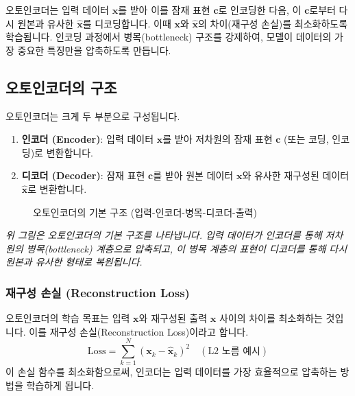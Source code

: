 \documentclass[11pt,a4paper]{article}
\theoremstyle{definition}
\begin{document}
\begin{infobox}
오토인코더는 입력 데이터 $\mathbf{x}$를 받아 이를 잠재 표현 $\mathbf{c}$로 인코딩한 다음, 이 $\mathbf{c}$로부터 다시 원본과 유사한 $\hat{\mathbf{x}}$를 디코딩합니다. 이때 $\mathbf{x}$와 $\hat{\mathbf{x}}$의 차이(재구성 손실)를 최소화하도록 학습됩니다. 인코딩 과정에서 병목(bottleneck) 구조를 강제하여, 모델이 데이터의 가장 중요한 특징만을 압축하도록 만듭니다.
\end{infobox}

\subsection{오토인코더의 구조}
오토인코더는 크게 두 부분으로 구성됩니다.

\begin{enumerate}
    \item \textbf{인코더 (Encoder)}: 입력 데이터 $\mathbf{x}$를 받아 저차원의 잠재 표현 $\mathbf{c}$ (또는 코딩, 인코딩)로 변환합니다.
    \item \textbf{디코더 (Decoder)}: 잠재 표현 $\mathbf{c}$를 받아 원본 데이터 $\mathbf{x}$와 유사한 재구성된 데이터 $\hat{\mathbf{x}}$로 변환합니다.
\end{enumerate}

\begin{figure}[h!]
\centering
\caption{오토인코더의 기본 구조 (입력-인코더-병목-디코더-출력)}
\label{fig:autoencoder_structure}
\end{figure}
\textit{위 그림은 오토인코더의 기본 구조를 나타냅니다. 입력 데이터가 인코더를 통해 저차원의 병목(bottleneck) 계층으로 압축되고, 이 병목 계층의 표현이 디코더를 통해 다시 원본과 유사한 형태로 복원됩니다.}

\subsubsection{재구성 손실 (Reconstruction Loss)}
오토인코더의 학습 목표는 입력 $\mathbf{x}$와 재구성된 출력 $\hat{\mathbf{x}}$ 사이의 차이를 최소화하는 것입니다. 이를 재구성 손실(Reconstruction Loss)이라고 합니다.
\begin{equation*}
\text{Loss} = \sum_{k=1}^{N} (\mathbf{x}_k - \hat{\mathbf{x}}_k)^2 \quad (\text{L2 노름 예시})
\end{equation*}
이 손실 함수를 최소화함으로써, 인코더는 입력 데이터를 가장 효율적으로 압축하는 방법을 학습하게 됩니다.
\end{document}
